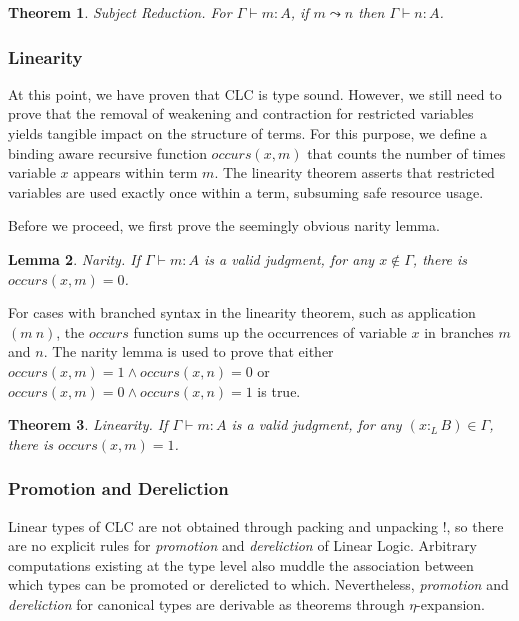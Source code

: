 \documentclass[sigplan,screen]{acmart}
\newtheorem{theorem}{Theorem}[section]
\newtheorem{lemma}[theorem]{Lemma}
\theoremstyle{definition}
\newcommand{\ltype}{:_{\scriptscriptstyle L}}
\newcommand{\pstep}{\leadsto}
\begin{document}
  \begin{theorem} 
    Subject Reduction. For $\Gamma \vdash m : A$, if $m \pstep n$ then $\Gamma \vdash n : A$.
  \end{theorem}

  \subsubsection{Linearity}
  At this point, we have proven that CLC is type sound. However, we still need to prove that the removal of weakening and contraction for restricted variables yields tangible impact on the structure of terms. For this purpose, we define a binding aware recursive function $occurs(x, m)$ that counts the number of times variable $x$ appears within term $m$. The linearity theorem asserts that restricted variables are used exactly once within a term, subsuming safe resource usage.

  Before we proceed, we first prove the seemingly obvious narity lemma. 

  \begin{lemma} 
    Narity. If $\Gamma \vdash m : A$ is a valid judgment, for any $x \notin \Gamma$, there is $occurs(x, m) = 0$.
  \end{lemma}

  For cases with branched syntax in the linearity theorem, such as application $(m\ n)$, the $occurs$ function sums up the occurrences of variable $x$ in branches $m$ and $n$. The narity lemma is used to prove that either $occurs(x, m) = 1 \wedge occurs(x, n) = 0$ or $occurs(x, m) = 0 \wedge occurs(x, n) = 1$ is true.

  \begin{theorem} 
    Linearity. If $\Gamma \vdash m : A$ is a valid judgment, for any $(x \ltype B) \in \Gamma$, there is $occurs(x, m) = 1$.
  \end{theorem}

  \subsubsection{Promotion and Dereliction}
  Linear types of CLC are not obtained through packing and unpacking !, so there are no explicit rules for \textit{promotion} and \textit{dereliction} of Linear Logic. Arbitrary computations existing at the type level also muddle the association between which types can be promoted or derelicted to which. Nevertheless, \textit{promotion} and \textit{dereliction} for canonical types are derivable as theorems through $\eta$-expansion.
\end{document}
